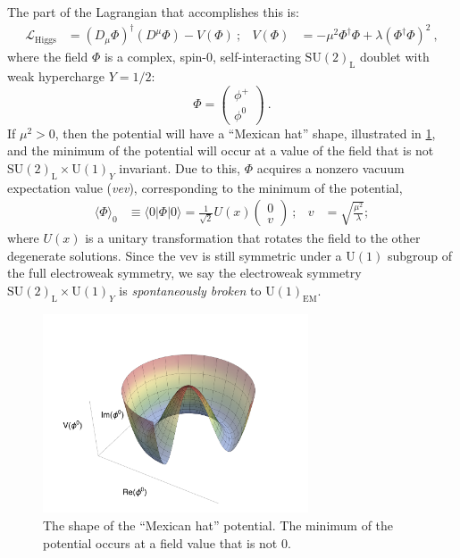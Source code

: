 The part of the Lagrangian that accomplishes this is: 
\begin{align}
\mathcal L_{\mathrm{Higgs}} &= (D_{\mu}\Phi)^{\dagger}(D^{\mu}\Phi) -
V(\Phi)~;& V(\Phi) &= -\mu^2\Phi^{\dagger}\Phi +
\lambda(\Phi^{\dagger}\Phi)^2~,
\label{eqn:Lhiggs}
\end{align}
where the field $\Phi$ is a complex, spin-$0$, self-interacting
$\mathrm{SU(2)}_{\mathrm{L}}$ doublet with weak hypercharge $Y=1/2$:
\begin{equation}
\Phi = \left(\begin{matrix} \phi^{+}\\\phi^0\end{matrix} \right)~.
\end{equation}
If $\mu^2>0$, then the potential will have a ``Mexican hat'' shape, illustrated in
\ref{fig:mexicanhat}, and the minimum of the potential will occur at a value of the field that is not $\mathrm{SU(2)}_{\mathrm{L}}\times\mathrm{U(1)}_Y$
invariant. Due to this, $\Phi$ acquires a nonzero vacuum
expectation value (\emph{vev}), corresponding to the minimum of the potential,
\begin{align}
\langle\Phi\rangle_0&\equiv \langle 0|\Phi|0\rangle =
\frac{1}{\sqrt{2}}U(x)\left(\begin{matrix} 0\\v\end{matrix} \right)~;&v &= \sqrt{\frac{\mu^2}{\lambda}};
\end{align}
where $U(x)$ is a unitary transformation that rotates the field
to the other degenerate solutions. Since the vev is still symmetric under a $\mathrm{U(1)}$ subgroup of the full
electroweak symmetry, we say the electroweak symmetry
$\mathrm{SU(2)}_{\mathrm{L}}\times\mathrm{U(1)}_Y$ is \emph{spontaneously
broken} to $\mathrm{U(1)}_{\mathrm{EM}}$. 

\begin{figure}
\centering
\includegraphics[width=0.7\textwidth]{figs/theory/MexicanHat.pdf}
\caption{\label{fig:mexicanhat} The shape of the ``Mexican hat''
  potential. The minimum of the potential occurs at
a field value that is not $0$.}
\end{figure}

